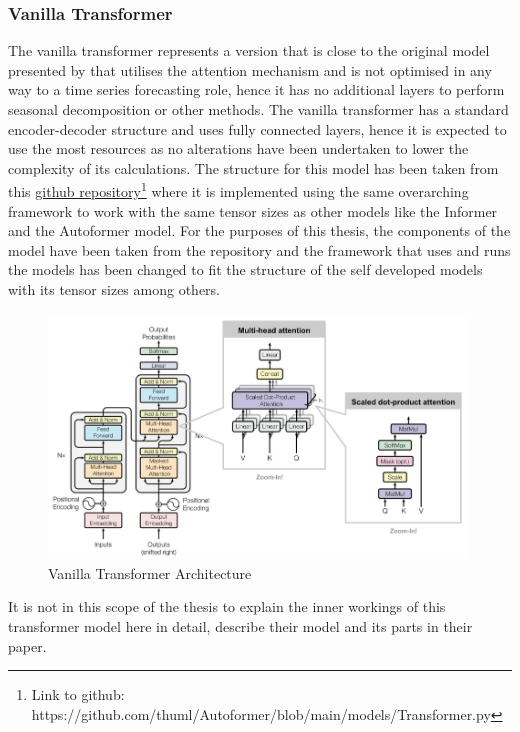 \documentclass{article}
\begin{document}
\subsubsection{Vanilla Transformer}

The vanilla transformer represents a version that is close to the original model presented by \cite{vanilla-transformer} that utilises the attention mechanism and is not optimised in any way to a time series forecasting role, hence it has no additional layers to perform seasonal decomposition or other methods.
The vanilla transformer has a standard encoder-decoder structure and uses fully connected layers, hence it is expected to use the most resources as no alterations have been undertaken to lower the complexity of its calculations. The structure for this model has been taken from this \href{https://github.com/thuml/Autoformer/blob/main/models/Transformer.py}{github repository}\footnote{Link to github: https://github.com/thuml/Autoformer/blob/main/models/Transformer.py} where it is implemented using the same overarching framework to work with the same tensor sizes as other models like the Informer and the Autoformer model. For the purposes of this thesis, the components of the model have been taken from the repository and the framework that uses and runs the models has been changed to fit the structure of the self developed models with its tensor sizes among others.
\begin{figure}
    \centering
    \includegraphics[width=\linewidth]{graphs/models/VanillaTransformer.png}
    \caption{Vanilla Transformer Architecture}
    \label{fig:VanillaTransformer_architecture}
\end{figure}
It is not in this scope of the thesis to explain the inner workings of this transformer model here in detail, \cite{vanilla-transformer} describe their model and its parts in their paper. \par 
\end{document}

